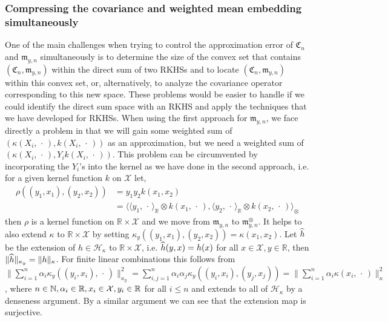 \documentclass[10pt]{amsart}
\theoremstyle{definition}\newtheorem{defi}[theo]{Definition}\newtheorem{rema}[theo]{Remark}\newtheorem{exam}[theo]{Example}\newtheorem{exem}[theo]{Example}\newtheorem{nota}[theo]{Notation}
\theoremstyle{remark}
\newcommand{\R}{\mathbb{R}}
\newcommand{\bbN}{\mathbb{N}}
\newcommand{\X}{\mathcal{X}}
\newcommand{\cH}{\mathcal{H}}
\newcommand{\fkC}{\mathfrak{C}}
\newcommand{\mean}{\mathfrak{m}}
\let\oldhat\hat
\renewcommand*{\hat}[1]{\mathchoice{\widehat{#1}}{\widehat{#1}}{\oldhat{#1}}{\oldhat{#1}}}
\begin{document}
\subsubsection{Compressing the covariance and weighted mean embedding simultaneously} One of the main challenges when trying to control the approximation error of $\fkC_n$ and $\mean_{y,n}$ simultaneously is to determine the size of the convex set that contains $(\fkC_n,\mean_{y,n})$ within the direct sum of two RKHSs and to locate $(\fkC_n,\mean_{y,n})$ within this convex set, or, alternatively, to analyze the covariance operator corresponding to this new space. These problems would be easier to handle if we could identify the direct sum space with an RKHS and apply the techniques that we have developed for RKHSs. When using the first approach for $\mean_{y,n}$, we face directly a problem in that we will gain some weighted sum of $(\kappa(X_i,\,\cdot\,),k(X_i,\,\cdot\,))$ as an approximation, but we need a weighted sum of $(\kappa(X_i,\,\cdot\,),Y_i k(X_i,\,\cdot\,))$. This problem can be circumvented by incorporating the $Y_i$'s into the kernel as we have done in the second approach, i.e. for a given kernel function $k$ on $\X$ let,
\begin{equation}\label{eq:def_rho}
\begin{aligned}
\rho((y_1,x_1),(y_2,x_2)) &= y_1 y_2 k(x_1,x_2)\\ 
&= \bigl\langle \langle y_1, \,\cdot\, \rangle_\R \otimes k(x_1,\,\cdot\,),\langle y_2, \,\cdot\, \rangle_\R \otimes k(x_2,\,\cdot\,)\bigr\rangle_\otimes
\end{aligned}
\end{equation}
then $\rho$ is a kernel function on $\R\times \X$ and we move from $\mean_{y,n}$ to $\mean_{y,n}^\otimes$. It helps to also extend $\kappa$ to $\R\times \X$ by setting $\kappa_y((y_1,x_1),(y_2,x_2)) = \kappa(x_1,x_2)$. Let $\hat h$ be the extension of $h \in \cH_\kappa$ to $\R \times \X$, i.e. $\hat h(y,x) = h(x)$ for all $x\in \X,y\in\R$, then $\|\hat h\|_{\kappa_y} = \|h\|_{\kappa}$. For finite linear combinations this follows from $\|\sum_{i=1}^n \alpha_i \kappa_y((y_i,x_i),\,\cdot\,)\|^2_{\kappa_y} = \sum_{i,j=1}^n \alpha_i \alpha_j \kappa_y((y_i,x_i), (y_j,x_j)) = \|\sum_{i=1}^n \alpha_i \kappa(x_i,\,\cdot\,)\|^2_\kappa$, where $n\in \bbN, \alpha_i \in \R, x_i\in \X,\linebreak y_i \in \R$ for all $i\leq n$ and extends to all of $\cH_\kappa$ by a denseness argument. By a similar argument we can see that the extension map is surjective.
\end{document}
